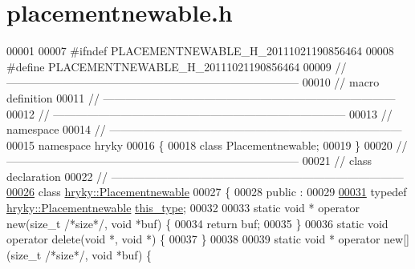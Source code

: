 \hypertarget{placementnewable_8h_source}{\section{placementnewable.\-h}
}

\begin{DoxyCode}
00001 
00007 \textcolor{preprocessor}{#ifndef PLACEMENTNEWABLE\_H\_20111021190856464}
00008 \textcolor{preprocessor}{}\textcolor{preprocessor}{#define PLACEMENTNEWABLE\_H\_20111021190856464}
00009 \textcolor{preprocessor}{}\textcolor{comment}{//
      ------------------------------------------------------------------------------}
00010 \textcolor{comment}{// macro definition}
00011 \textcolor{comment}{//
      ------------------------------------------------------------------------------}
00012 \textcolor{comment}{//
      ------------------------------------------------------------------------------}
00013 \textcolor{comment}{// namespace}
00014 \textcolor{comment}{//
      ------------------------------------------------------------------------------}
00015 \textcolor{keyword}{namespace }hryky
00016 \{
00018     \textcolor{keyword}{class }Placementnewable;
00019 \}
00020 \textcolor{comment}{//
      ------------------------------------------------------------------------------}
00021 \textcolor{comment}{// class declaration}
00022 \textcolor{comment}{//
      ------------------------------------------------------------------------------}
\hypertarget{placementnewable_8h_source_l00026}{}\hyperlink{classhryky_1_1_placementnewable}{00026} \textcolor{comment}{}\textcolor{keyword}{class }\hyperlink{classhryky_1_1_placementnewable}{hryky::Placementnewable}
00027 \{
00028 \textcolor{keyword}{public} :
00029 
\hypertarget{placementnewable_8h_source_l00031}{}\hyperlink{classhryky_1_1_placementnewable_a3ace62969c7f685d944479a32ba7c6aa}{00031}     \textcolor{keyword}{typedef} \hyperlink{classhryky_1_1_placementnewable}{hryky::Placementnewable} \hyperlink{classhryky_1_1_placementnewable_a3ace62969c7f685d944479a32ba7c6aa}{this_type};
00032 
00033     \textcolor{keyword}{static} \textcolor{keywordtype}{void} * operator new(\textcolor{keywordtype}{size\_t} \textcolor{comment}{/*size*/}, \textcolor{keywordtype}{void} *buf) \{
00034         \textcolor{keywordflow}{return} buf;
00035     \}
00036     \textcolor{keyword}{static} \textcolor{keywordtype}{void} operator delete(\textcolor{keywordtype}{void} *, \textcolor{keywordtype}{void} *) \{
00037     \}
00038 
00039     \textcolor{keyword}{static} \textcolor{keywordtype}{void} * operator new[](\textcolor{keywordtype}{size\_t} \textcolor{comment}{/*size*/}, \textcolor{keywordtype}{void} *buf) \{

\end{DoxyCode}

